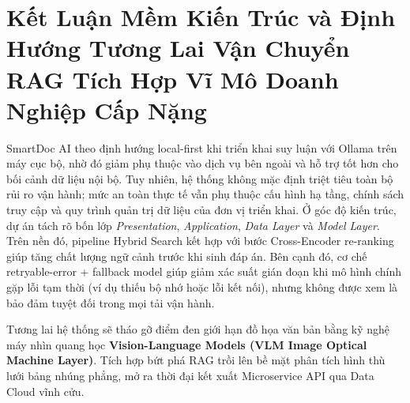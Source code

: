 \documentclass[10pt, conference, a4paper, compsocconf]{IEEEtran}
\begin{document}
\section{Kết Luận Mềm Kiến Trúc và Định Hướng Tương Lai Vận Chuyển RAG Tích Hợp Vĩ Mô Doanh Nghiệp Cấp Nặng}
SmartDoc AI theo định hướng local-first khi triển khai suy luận với Ollama trên máy cục bộ, nhờ đó giảm phụ thuộc vào dịch vụ bên ngoài và hỗ trợ tốt hơn cho bối cảnh dữ liệu nội bộ. Tuy nhiên, hệ thống không mặc định triệt tiêu toàn bộ rủi ro vận hành; mức an toàn thực tế vẫn phụ thuộc cấu hình hạ tầng, chính sách truy cập và quy trình quản trị dữ liệu của đơn vị triển khai.
Ở góc độ kiến trúc, dự án tách rõ bốn lớp \textit{Presentation}, \textit{Application}, \textit{Data Layer} và \textit{Model Layer}. Trên nền đó, pipeline Hybrid Search kết hợp với bước Cross-Encoder re-ranking giúp tăng chất lượng ngữ cảnh trước khi sinh đáp án. Bên cạnh đó, cơ chế retryable-error + fallback model giúp giảm xác suất gián đoạn khi mô hình chính gặp lỗi tạm thời (ví dụ thiếu bộ nhớ hoặc lỗi kết nối), nhưng không được xem là bảo đảm tuyệt đối trong mọi tải vận hành.

Tương lai hệ thống sẽ tháo gỡ điểm đen giới hạn đồ họa văn bản bằng kỹ nghệ máy nhìn quang học \textbf{Vision-Language Models (VLM Image Optical Machine Layer)}. Tích hợp bứt phá RAG trồi lên bề mặt phân tích hình thù lưới bảng nhúng phẳng, mở ra thời đại kết xuất Microservice API qua Data Cloud vĩnh cửu.
\end{document}
